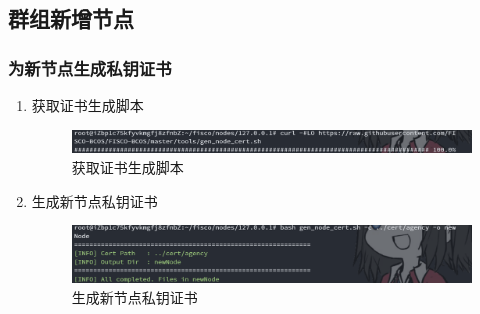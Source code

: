 \documentclass[a4paper, 11pt]{article}
\begin{document}
\subsection{群组新增节点}
\subsubsection{为新节点生成私钥证书}
\begin{enumerate}
      \item 获取证书生成脚本
      \begin{figure}[H]
            \centering
            \includegraphics[width = 0.8 \textwidth]{gen_node.png}
            \caption{获取证书生成脚本}
      \end{figure}

      \item 生成新节点私钥证书
      \begin{figure}[H]
            \centering
            \includegraphics[width = 0.8 \textwidth]{newNode.png}
            \caption{生成新节点私钥证书}
      \end{figure}
\end{enumerate}
\end{document}
